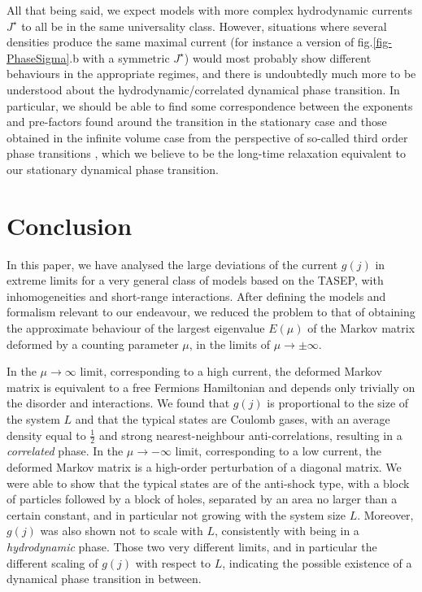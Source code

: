 \documentclass[aps,pre,onecolumn,showpacs,showkeys,a4paper]{revtex4-1}
\begin{document}
All that being said, we expect models with more complex hydrodynamic currents $J^\star$ to all be in the same universality class. However, situations where several densities produce the same maximal current (for instance a version of fig.\ref{fig-PhaseSigma}.b with a symmetric $J^\star$) would most probably show different behaviours in the appropriate regimes, and there is undoubtedly much more to be understood about the hydrodynamic/correlated dynamical phase transition. In particular, we should be able to find some correspondence between the exponents and pre-factors found around the transition in the stationary case and those obtained in the infinite volume case from the perspective of so-called third order phase transitions \cite{Majumdar2014,LeDoussal2016}, which we believe to be the long-time relaxation equivalent to our stationary dynamical phase transition.





\newpage

\section{Conclusion}

In this paper, we have analysed the large deviations of the current $g(j)$ in extreme limits for a very general class of models based on the TASEP, with inhomogeneities and short-range interactions. After defining the models and formalism relevant to our endeavour, we reduced the problem to that of obtaining the approximate behaviour of the largest eigenvalue $E(\mu)$ of the Markov matrix deformed by a counting parameter $\mu$, in the limits of $\mu\rightarrow\pm\infty$.

In the $\mu\rightarrow\infty$ limit, corresponding to a high current, the deformed Markov matrix is equivalent to a free Fermions Hamiltonian and depends only trivially on the disorder and interactions. We found that $g(j)$ is proportional to the size of the system $L$ and that the typical states are Coulomb gases, with an average density equal to $\frac{1}{2}$ and strong nearest-neighbour anti-correlations, resulting in a \textit{correlated} phase. In the $\mu\rightarrow -\infty$ limit, corresponding to a low current, the deformed Markov matrix is a high-order perturbation of a diagonal matrix. We were able to show that the typical states are of the anti-shock type, with a block of particles followed by a block of holes, separated by an area no larger than a certain constant, and in particular not growing with the system size $L$. Moreover, $g(j)$ was also shown not to scale with $L$, consistently with being in a \textit{hydrodynamic} phase. Those two very different limits, and in particular the different scaling of $g(j)$ with respect to $L$, indicating the possible existence of a dynamical phase transition in between.
\end{document}

